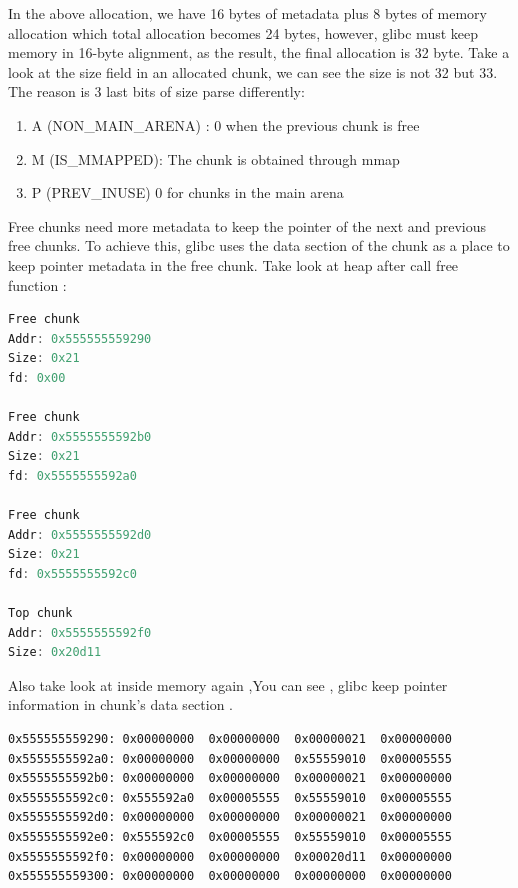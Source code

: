 \documentclass{masterthesis}
\newcommand*\libc{glibc}
\begin{document}
In the above allocation, we have 16 bytes of metadata plus 8 bytes of memory allocation which total allocation becomes 24 bytes, however, \libc{} must keep memory in 16-byte alignment, as the result, the final allocation is 32 byte. Take a look at the size field in an allocated chunk, we can see the size is not 32 but 33. The reason is 3 last bits of size parse differently:
\begin{enumerate}
	\item A (NON\_MAIN\_ARENA) : 0 when the previous chunk is free
	\item M (IS\_MMAPPED): The chunk is obtained through mmap
	\item P (PREV\_INUSE) 0 for chunks in the main arena
\end{enumerate}
Free chunks need more metadata to keep the pointer of the next and previous free chunks. To achieve this, \libc{} uses the data section of the chunk as a place to keep pointer metadata in the free chunk. Take look at heap after call free function :

\begin{lstlisting}[language=c,frame=tlrb]
Free chunk 
Addr: 0x555555559290
Size: 0x21
fd: 0x00

Free chunk
Addr: 0x5555555592b0
Size: 0x21
fd: 0x5555555592a0

Free chunk 
Addr: 0x5555555592d0
Size: 0x21
fd: 0x5555555592c0

Top chunk
Addr: 0x5555555592f0
Size: 0x20d11
\end{lstlisting}

Also take look at inside memory again ,You can see , \libc{} keep pointer information in chunk's data section .

\begin{lstlisting}[frame=tlrb]
0x555555559290:	0x00000000	0x00000000	0x00000021	0x00000000
0x5555555592a0:	0x00000000	0x00000000	0x55559010	0x00005555
0x5555555592b0:	0x00000000	0x00000000	0x00000021	0x00000000
0x5555555592c0:	0x555592a0	0x00005555	0x55559010	0x00005555
0x5555555592d0:	0x00000000	0x00000000	0x00000021	0x00000000
0x5555555592e0:	0x555592c0	0x00005555	0x55559010	0x00005555
0x5555555592f0:	0x00000000	0x00000000	0x00020d11	0x00000000
0x555555559300:	0x00000000	0x00000000	0x00000000	0x00000000
\end{lstlisting}
 
\end{document}

